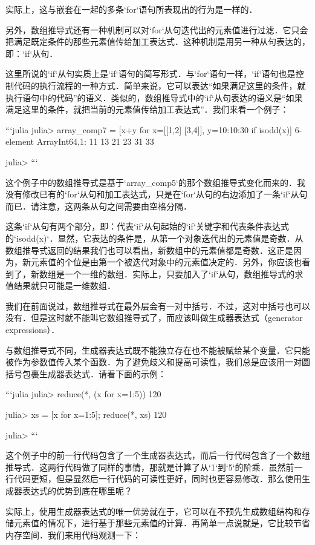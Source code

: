 实际上，这与嵌套在一起的多条`for`语句所表现出的行为是一样的．

另外，数组推导式还有一种机制可以对`for`从句迭代出的元素值进行过滤．它只会把满足既定条件的那些元素值传给加工表达式．这种机制是用另一种从句表达的，即：`if`从句．

这里所说的`if`从句实质上是`if`语句的简写形式．与`for`语句一样，`if`语句也是控制代码的执行流程的一种方式．简单来说，它可以表达“如果满足这里的条件，就执行语句中的代码”的语义．类似的，数组推导式中的`if`从句表达的语义是“如果满足这里的条件，就把当前的元素值传给加工表达式”．我们来看一个例子：

```julia
julia> array_comp7 = [x+y for x=[[1,2] [3,4]], y=10:10:30 if isodd(x)]
6-element Array{Int64,1}:
 11
 13
 21
 23
 31
 33

julia>
```

这个例子中的数组推导式是基于`array_comp5`的那个数组推导式变化而来的．我没有修改已有的`for`从句和加工表达式，只是在`for`从句的右边添加了一条`if`从句而已．请注意，这两条从句之间需要由空格分隔．

这条`if`从句有两个部分，即：代表`if`从句起始的`if`关键字和代表条件表达式的`isodd(x)`．显然，它表达的条件是，从第一个对象迭代出的元素值是奇数．从数组推导式返回的结果我们也可以看出，新数组中的元素值都是奇数．这正是因为，新元素值的个位是由第一个被迭代对象中的元素值决定的．另外，你应该也看到了，新数组是一个一维的数组．实际上，只要加入了`if`从句，数组推导式的求值结果就只可能是一维数组．

我们在前面说过，数组推导式在最外层会有一对中括号．不过，这对中括号也可以没有．但是这时就不能叫它数组推导式了，而应该叫做生成器表达式（generator expressions）．

与数组推导式不同，生成器表达式既不能独立存在也不能被赋给某个变量．它只能被作为参数值传入某个函数．为了避免歧义和提高可读性，我们总是应该用一对圆括号包裹生成器表达式．请看下面的示例：

```julia
julia> reduce(*, (x for x=1:5))
120

julia> xs = [x for x=1:5]; reduce(*, xs)
120

julia> 
```

这个例子中的前一行代码包含了一个生成器表达式，而后一行代码包含了一个数组推导式．这两行代码做了同样的事情，那就是计算了从`1`到`5`的阶乘．虽然前一行代码更短，但是显然后一行代码的可读性更好，同时也更容易修改．那么使用生成器表达式的优势到底在哪里呢？

实际上，使用生成器表达式的唯一优势就在于，它可以在不预先生成数组结构和存储元素值的情况下，进行基于那些元素值的计算．再简单一点说就是，它比较节省内存空间．我们来用代码观测一下：

